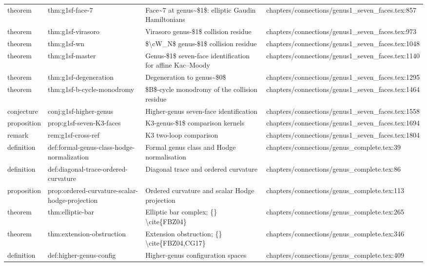 \documentclass[11pt]{article}
\begin{document}
\begin{longtable}{L{0.10\textwidth}L{0.26\textwidth}L{0.42\textwidth}L{0.22\textwidth}}
theorem & thm:g1sf-face-7 & Face\textasciitilde{}7 at genus\textasciitilde{}\$1\$: elliptic Gaudin Hamiltonians & chapters/connections/genus1\_seven\_faces.tex:857\\
theorem & thm:g1sf-virasoro & Virasoro genus-\$1\$ collision residue & chapters/connections/genus1\_seven\_faces.tex:973\\
theorem & thm:g1sf-wn & \$\textbackslash{}cW\_N\$ genus-\$1\$ collision residue & chapters/connections/genus1\_seven\_faces.tex:1048\\
theorem & thm:g1sf-master & Genus-\$1\$ seven-face identification for affine Kac--Moody & chapters/connections/genus1\_seven\_faces.tex:1140\\
theorem & thm:g1sf-degeneration & Degeneration to genus\textasciitilde{}\$0\$ & chapters/connections/genus1\_seven\_faces.tex:1295\\
theorem & thm:g1sf-b-cycle-monodromy & \$B\$-cycle monodromy of the collision residue & chapters/connections/genus1\_seven\_faces.tex:1464\\
conjecture & conj:g1sf-higher-genus & Higher-genus seven-face identification & chapters/connections/genus1\_seven\_faces.tex:1558\\
proposition & prop:g1sf-seven-K3-faces & K3-genus-\$1\$ comparison kernels & chapters/connections/genus1\_seven\_faces.tex:1694\\
remark & rem:g1sf-cross-ref & K3 two-loop comparison & chapters/connections/genus1\_seven\_faces.tex:1804\\
definition & def:formal-genus-class-hodge-normalization & Formal genus class and Hodge normalisation & chapters/connections/genus\_complete.tex:39\\
definition & def:diagonal-trace-ordered-curvature & Diagonal trace and ordered curvature & chapters/connections/genus\_complete.tex:86\\
proposition & prop:ordered-curvature-scalar-hodge-projection & Ordered curvature and scalar Hodge projection & chapters/connections/genus\_complete.tex:113\\
theorem & thm:elliptic-bar & Elliptic bar complex; \{\} \textbackslash{}cite\{FBZ04\} & chapters/connections/genus\_complete.tex:265\\
theorem & thm:extension-obstruction & Extension obstruction; \{\} \textbackslash{}cite\{FBZ04,CG17\} & chapters/connections/genus\_complete.tex:346\\
definition & def:higher-genus-config & Higher-genus configuration spaces & chapters/connections/genus\_complete.tex:409\\

\end{longtable}
\end{document}
